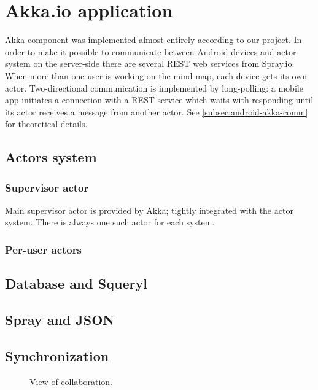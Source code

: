 \section{Akka.io application}
\label{sec:akka-app}
Akka component was implemented almost entirely according to our project. In order to make it possible to communicate between Android devices and actor system on the server-side there are several REST web services from Spray.io. When more than one user is working on the mind map, each device gets its own actor.  Two-directional communication is implemented by long-polling: a mobile app initiates a connection with a REST service which waits with responding until its actor receives a message from another actor. See \cref{subsec:android-akka-comm} for theoretical details.  

\subsection{Actors system }
\label{subsection:akka-actors}

\subsubsection{Supervisor actor}
\label{subsubsection:akka-actors-supervisor}
Main supervisor actor is provided by Akka; tightly integrated with the actor system. There is always one such actor for each system.
	
\subsubsection{Per-user actors}
\label{subsubsection:akka-actors-peruser}

\subsection{Database and Squeryl}
\label{subsection:akka-database}

\subsection{Spray and JSON}
\label{subsection:akka-spray}

\subsection{Synchronization}
\label{subsection:akka-synchro}

\begin{figure}[h]
	\centering
	\caption{View of collaboration.}
	\label{fig:screen-collaboration}
\end{figure}
